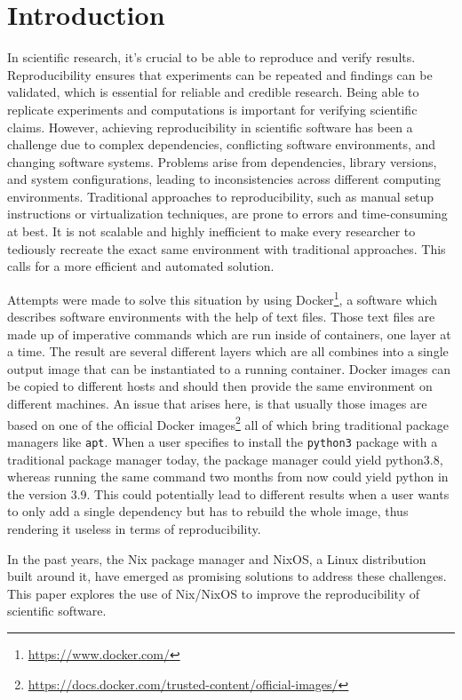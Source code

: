 \documentclass[conference,final,a4paper]{IEEEtran}
\begin{document}
\section{Introduction}

In scientific research, it's crucial to be able to reproduce and verify results.
Reproducibility ensures that experiments can be repeated and findings can be validated, which is essential for reliable and credible research.
Being able to replicate experiments and computations is important for verifying scientific claims.
However, achieving reproducibility in scientific software has been a challenge due to complex dependencies, conflicting software environments, and changing software systems.
Problems arise from dependencies, library versions, and system configurations, leading to inconsistencies across different computing environments.
Traditional approaches to reproducibility, such as manual setup instructions or virtualization techniques, are prone to errors and time-consuming at best.
It is not scalable and highly inefficient to make every researcher to tediously recreate the exact same environment with traditional approaches.
This calls for a more efficient and automated solution.

Attempts were made to solve this situation by using Docker\footnote{\url{https://www.docker.com/}}, a software which describes software environments with the help of text files.
Those text files are made up of imperative commands which are run inside of containers, one layer at a time.
The result are several different layers which are all combines into a single output image that can be instantiated to a running container.
Docker images can be copied to different hosts and should then provide the same environment on different machines.
An issue that arises here, is that usually those images are based on one of the official Docker images\footnote{\url{https://docs.docker.com/trusted-content/official-images/}} all of which bring traditional package managers like \texttt{apt}.
When a user specifies to install the \texttt{python3} package with a traditional package manager today, the package manager could yield python3.8, whereas running the same command two months from now could yield python in the version 3.9.
This could potentially lead to different results when a user wants to only add a single dependency but has to rebuild the whole image, thus rendering it useless in terms of reproducibility.

In the past years, the Nix package manager\cite{Dolstra_2004} and NixOS\cite{Dolstra_2010}, a Linux distribution built around it, have emerged as promising solutions to address these challenges.
This paper explores the use of Nix/NixOS to improve the reproducibility of scientific software.
\end{document}

